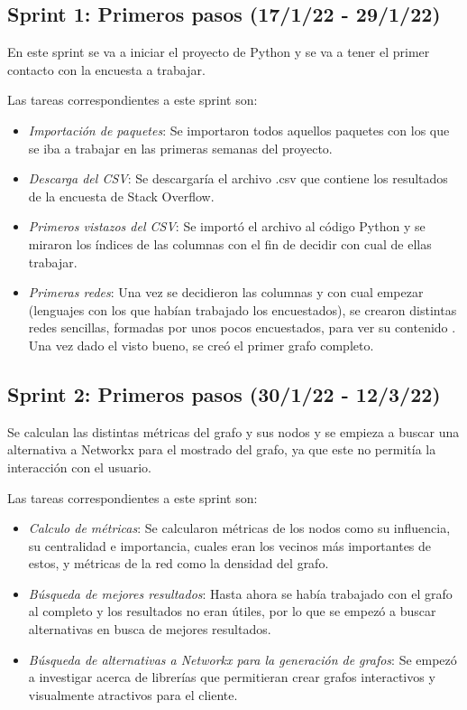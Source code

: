 \subsection{Sprint 1: Primeros pasos (17/1/22 - 29/1/22)}
En este sprint se va a iniciar el proyecto de Python y se va a tener el primer contacto con la encuesta a trabajar.

Las tareas correspondientes a este sprint son:
\begin{itemize}
    \item \textit{Importación de paquetes}: Se importaron todos aquellos paquetes con los que se iba a trabajar en las primeras semanas del proyecto.
    \item \textit{Descarga del CSV}: Se descargaría el archivo .csv que contiene los resultados de la encuesta de Stack Overflow.
    \item \textit{Primeros vistazos del CSV}: Se importó el archivo al código Python y se miraron los índices de las columnas con el fin de decidir con cual de ellas trabajar.
    \item \textit{Primeras redes}: Una vez se decidieron las columnas y con cual empezar (lenguajes con los que habían trabajado los encuestados), se crearon distintas redes sencillas, formadas por unos pocos encuestados, para ver su contenido . Una vez dado el visto bueno, se creó el primer grafo completo.
\end{itemize}

\subsection{Sprint 2: Primeros pasos (30/1/22 - 12/3/22)}
Se calculan las distintas métricas del grafo y sus nodos y se empieza a buscar una alternativa a Networkx para el mostrado del grafo, ya que este no permitía la interacción con el usuario.

Las tareas correspondientes a este sprint son:
\begin{itemize}
    \item \textit{Calculo de métricas}: Se calcularon métricas de los nodos como su influencia, su centralidad e importancia, cuales eran los vecinos más importantes de estos, y métricas de la red como la densidad del grafo.
    \item \textit{Búsqueda de mejores resultados}: Hasta ahora se había trabajado con el grafo al completo y los resultados no eran útiles, por lo que se empezó a buscar alternativas en busca de mejores resultados.
    \item \textit{Búsqueda de alternativas a Networkx para la generación de grafos}: Se empezó a investigar acerca de librerías que permitieran crear grafos interactivos y visualmente atractivos para el cliente.
\end{itemize}

